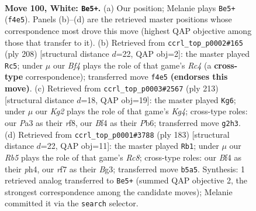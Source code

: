 \documentclass[11pt]{article}
\begin{document}
\clearpage

\begin{figure}[p]\centering
\begin{subfigure}{0.46\textwidth}\centering
\resizebox{\linewidth}{!}{%
\newchessgame
\chessboard[
  setfen={7k/5r2/1n5P/1R6/p4B2/P7/6K1/8 w - - 0 100},
  showmover=false,
  pgfstyle=straightmove, color=movearrow, markmove={f4-e5}
]}
\caption{}
\end{subfigure}\hfill
\begin{subfigure}{0.46\textwidth}\centering
\resizebox{\linewidth}{!}{%
\newchessgame
\chessboard[
  setfen={8/8/1kp5/8/PPR5/7r/1K6/8 w - - 3 105},
  showmover=false,
  pgfstyle=straightmove, color=movearrow, markmove={c4-c5}
]}
\caption{}
\end{subfigure}
\\[4pt]
\begin{subfigure}{0.46\textwidth}\centering
\resizebox{\linewidth}{!}{%
\newchessgame
\chessboard[
  setfen={5R2/8/1p6/1p4k1/8/P1K4p/3Nr3/8 b - - 5 107},
  showmover=false,
  pgfstyle=straightmove, color=movearrow, markmove={g5-g6}
]}
\caption{}
\end{subfigure}\hfill
\begin{subfigure}{0.46\textwidth}\centering
\resizebox{\linewidth}{!}{%
\newchessgame
\chessboard[
  setfen={5R2/1P6/6k1/2NK3p/6pP/6b1/8/2r5 b - - 2 92},
  showmover=false,
  pgfstyle=straightmove, color=movearrow, markmove={c1-b1}
]}
\caption{}
\end{subfigure}
\caption{\textbf{Move 100, White: \texttt{Be5+}.} (a) Our position; Melanie plays \texttt{Be5+} (\texttt{f4e5}). Panels (b)--(d) are the retrieved master positions whose correspondence most drove this move (highest QAP objective among those that transfer to it). (b) Retrieved from \texttt{ccrl\_top\_p0002\#165} (ply 208) [structural distance $d$=22, QAP obj=2]: the master played \texttt{Rc5}; under $\mu$ our \emph{Bf4} plays the role of that game's \emph{Rc4} (a \textbf{cross-type} correspondence); transferred move \texttt{f4e5} \textbf{(endorses this move)}. (c) Retrieved from \texttt{ccrl\_top\_p0003\#2567} (ply 213) [structural distance $d$=18, QAP obj=19]: the master played \texttt{Kg6}; under $\mu$ our \emph{Kg2} plays the role of that game's \emph{Kg4}; cross-type roles: our \emph{P}a3 as their \emph{r}f8, our \emph{B}f4 as their \emph{P}b6; transferred move \texttt{g2h3}. (d) Retrieved from \texttt{ccrl\_top\_p0001\#3788} (ply 183) [structural distance $d$=22, QAP obj=11]: the master played \texttt{Rb1}; under $\mu$ our \emph{Rb5} plays the role of that game's \emph{Rc8}; cross-type roles: our \emph{B}f4 as their \emph{p}h4, our \emph{r}f7 as their \emph{B}g3; transferred move \texttt{b5a5}. Synthesis: 1 retrieved analog transferred to \texttt{Be5+} (summed QAP objective 2, the strongest correspondence among the candidate moves); Melanie committed it via the \texttt{search} selector.}
\label{fig:thought-m198}
\end{figure}
\end{document}
